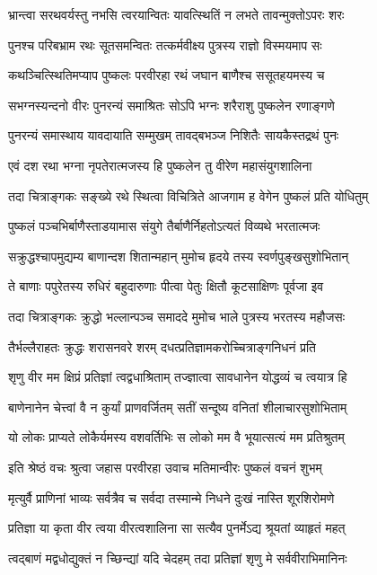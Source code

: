 \twolineshloka
{भ्रान्त्वा सरथवर्यस्तु नभसि त्वरयान्वितः}
{यावत्स्थितिं न लभते तावन्मुक्तोऽपरः शरः}%

\twolineshloka
{पुनश्च परिबभ्राम रथः सूतसमन्वितः}
{तत्कर्मवीक्ष्य पुत्रस्य राज्ञो विस्मयमाप सः}%

\twolineshloka
{कथञ्चित्स्थितिमप्याप पुष्कलः परवीरहा}
{रथं जघान बाणैश्च ससूतहयमस्य च}%

\twolineshloka
{सभग्नस्यन्दनो वीरः पुनरन्यं समाश्रितः}
{सोऽपि भग्नः शरैराशु पुष्कलेन रणाङ्गणे}%

\twolineshloka
{पुनरन्यं समास्थाय यावदायाति सम्मुखम्}
{तावद्बभञ्ज निशितैः सायकैस्तद्रथं पुनः}%

\twolineshloka
{एवं दश रथा भग्ना नृपतेरात्मजस्य हि}
{पुष्कलेन तु वीरेण महासंयुगशालिना}%

\twolineshloka
{तदा चित्राङ्गकः सङ्ख्ये रथे स्थित्वा विचित्रिते}
{आजगाम ह वेगेन पुष्कलं प्रति योधितुम्}%

\twolineshloka
{पुष्कलं पञ्चभिर्बाणैस्ताडयामास संयुगे}
{तैर्बाणैर्निहतोऽत्यतं विव्यथे भरतात्मजः}%

\twolineshloka
{सक्रुद्धश्चापमुद्यम्य बाणान्दश शितान्महान्}
{मुमोच हृदये तस्य स्वर्णपुङ्खसुशोभितान्}%

\twolineshloka
{ते बाणाः पपुरेतस्य रुधिरं बहुदारुणाः}
{पीत्वा पेतुः क्षितौ कूटसाक्षिणः पूर्वजा इव}%

\twolineshloka
{तदा चित्राङ्गकः क्रुद्धो भल्लान्पञ्च समाददे}
{मुमोच भाले पुत्रस्य भरतस्य महौजसः}%

\twolineshloka
{तैर्भल्लैराहतः क्रुद्धः शरासनवरे शरम्}
{दधत्प्रतिज्ञामकरोच्चित्राङ्गनिधनं प्रति}%

\twolineshloka
{शृणु वीर मम क्षिप्रं प्रतिज्ञां त्वद्वधाश्रिताम्}
{तज्ज्ञात्वा सावधानेन योद्धव्यं च त्वयात्र हि}%

\twolineshloka
{बाणेनानेन चेत्त्वां वै न कुर्यां प्राणवर्जितम्}
{सतीं सन्दूष्य वनितां शीलाचारसुशोभिताम्}%

\twolineshloka
{यो लोकः प्राप्यते लोकैर्यमस्य वशवर्तिभिः}
{स लोको मम वै भूयात्सत्यं मम प्रतिश्रुतम्}%

\twolineshloka
{इति श्रेष्ठं वचः श्रुत्वा जहास परवीरहा}
{उवाच मतिमान्वीरः पुष्कलं वचनं शुभम्}%

\twolineshloka
{मृत्युर्वै प्राणिनां भाव्यः सर्वत्रैव च सर्वदा}
{तस्मान्मे निधने दुःखं नास्ति शूरशिरोमणे}%

\twolineshloka
{प्रतिज्ञा या कृता वीर त्वया वीरत्वशालिना}
{सा सत्यैव पुनर्मेऽद्य श्रूयतां व्याहृतं महत्}%

\twolineshloka
{त्वद्बाणं मद्वधोद्युक्तं न च्छिन्द्यां यदि चेदहम्}
{तदा प्रतिज्ञां शृणु मे सर्ववीराभिमानिनः}%

